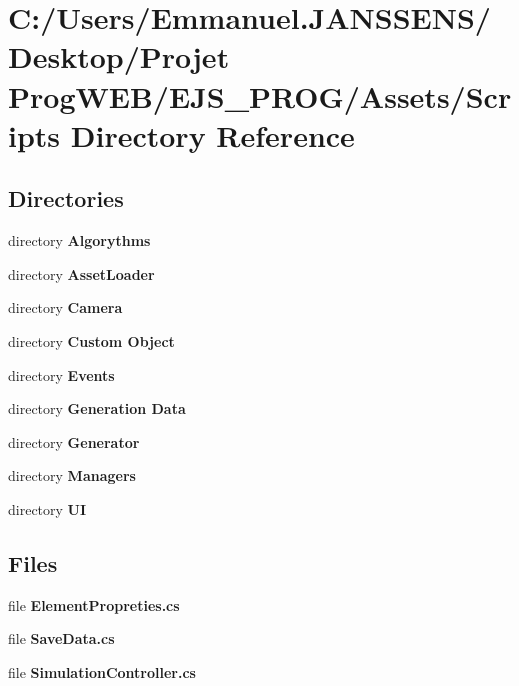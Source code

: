 \section{C\+:/\+Users/\+Emmanuel.J\+A\+N\+S\+S\+E\+N\+S/\+Desktop/\+Projet Prog\+W\+E\+B/\+E\+J\+S\+\_\+\+P\+R\+O\+G/\+Assets/\+Scripts Directory Reference}
\label{dir_4edcbb236dfd51dd81727243a38df6a0}
\subsection*{Directories}
\begin{DoxyCompactItemize}
\item 
directory \textbf{ Algorythms}
\item 
directory \textbf{ Asset\+Loader}
\item 
directory \textbf{ Camera}
\item 
directory \textbf{ Custom Object}
\item 
directory \textbf{ Events}
\item 
directory \textbf{ Generation Data}
\item 
directory \textbf{ Generator}
\item 
directory \textbf{ Managers}
\item 
directory \textbf{ UI}
\end{DoxyCompactItemize}
\subsection*{Files}
\begin{DoxyCompactItemize}
\item 
file \textbf{ Element\+Propreties.\+cs}
\item 
file \textbf{ Save\+Data.\+cs}
\item 
file \textbf{ Simulation\+Controller.\+cs}
\end{DoxyCompactItemize}
